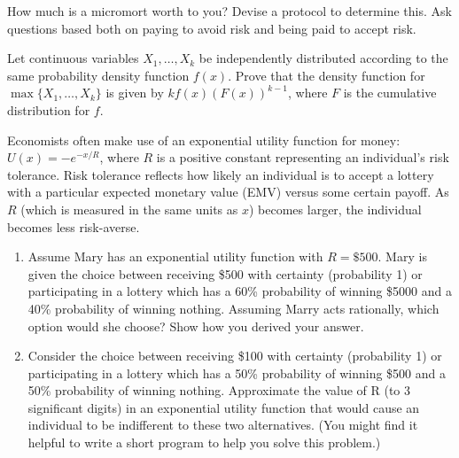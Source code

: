 \begin{exercise}
How much is a micromort worth to you?  Devise a protocol to determine this.
Ask questions based both on paying to avoid risk and being paid to accept risk.
\end{exercise} 

\begin{exercise}
Let continuous variables \(X_1,\ldots,X_k\) be independently
distributed according to the same probability density function
\(f(x)\).  Prove that the density function for
\(\max\{X_1,\ldots,X_k\}\) is given by \(kf(x)(F(x))^{k-1}\), where
\(F\) is the cumulative distribution for \(f\).
\end{exercise} 

\begin{uexercise}
Economists often make use of an
exponential utility function for money: \(U(x) = -e^{-x/R}\), where \(R\) is
a positive constant representing an individual's risk tolerance.  
Risk tolerance reflects how likely an individual is to accept a
lottery with a particular expected monetary value (EMV) versus some
certain payoff.  As \(R\) (which is measured in the same units as \(x\))
becomes larger, the individual becomes less risk-averse.
\begin{enumerate}
\item Assume Mary has an exponential utility function with \(R = \$500\).  Mary
is given the choice between receiving \$500 with certainty (probability
1) or participating in a lottery which has a 60\% probability of
winning \$5000 and a 40\% probability of winning nothing.  Assuming
Marry acts rationally, which option would she choose?  Show how you
derived your answer.

\item Consider the choice between receiving \$100 with certainty
(probability 1) or participating in a lottery which has a 50\%
probability of winning \$500 and a 50\% probability of winning nothing.
Approximate the value of R (to 3 significant digits) in an exponential
utility function that would cause an individual to be indifferent to
these two alternatives.  (You might find it helpful to write a short
program to help you solve this problem.)
\end{enumerate}
\end{uexercise} 

